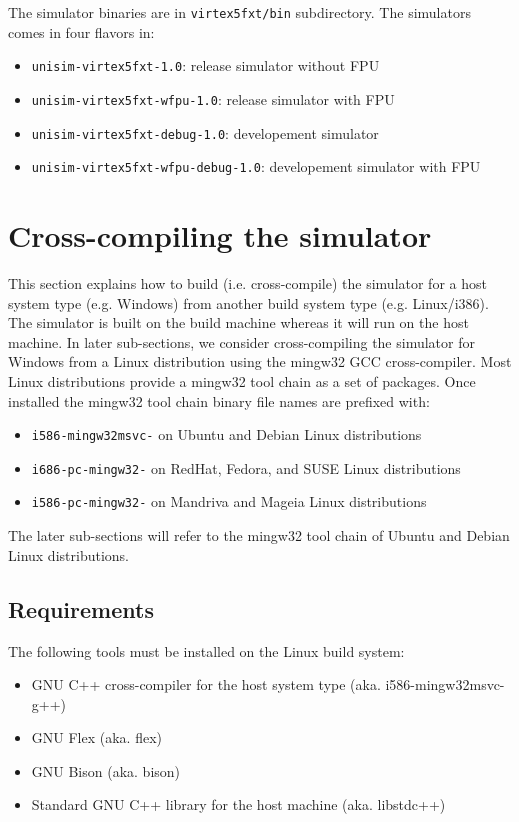 \noindent The simulator binaries are in \texttt{virtex5fxt/bin} subdirectory.
The simulators comes in four flavors in:
\begin{itemize}
\item \texttt{unisim-virtex5fxt-1.0}: release simulator without FPU
\item \texttt{unisim-virtex5fxt-wfpu-1.0}: release simulator with FPU
\item \texttt{unisim-virtex5fxt-debug-1.0}: developement simulator
\item \texttt{unisim-virtex5fxt-wfpu-debug-1.0}: developement simulator with FPU
\end{itemize}

\section{Cross-compiling the simulator}

This section explains how to build (i.e. cross-compile) the simulator for a host system type (e.g. Windows) from another build system type (e.g. Linux/i386).
The simulator is built on the build machine whereas it will run on the host machine.
In later sub-sections, we consider cross-compiling the simulator for Windows from a Linux distribution using the mingw32 GCC cross-compiler.
Most Linux distributions provide a mingw32 tool chain as a set of packages.
Once installed the mingw32 tool chain binary file names are prefixed with:
\begin{itemize}
\item \texttt{i586-mingw32msvc-} on Ubuntu and Debian Linux distributions
\item \texttt{i686-pc-mingw32-} on RedHat, Fedora, and SUSE Linux distributions
\item \texttt{i586-pc-mingw32-} on Mandriva and Mageia Linux distributions
\end{itemize}
The later sub-sections will refer to the mingw32 tool chain of Ubuntu and Debian Linux distributions.

\subsection{Requirements}

\noindent The following tools must be installed on the Linux build system:
\begin{itemize}
\item GNU C++ cross-compiler for the host system type (aka. i586-mingw32msvc-g++)
\item GNU Flex (aka. flex)
\item GNU Bison (aka. bison)
\item Standard GNU C++ library for the host machine (aka. libstdc++)
\end{itemize}

